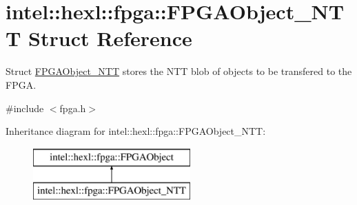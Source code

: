 \hypertarget{structintel_1_1hexl_1_1fpga_1_1FPGAObject__NTT}{\section{intel\-:\-:hexl\-:\-:fpga\-:\-:F\-P\-G\-A\-Object\-\_\-\-N\-T\-T Struct Reference}
\label{structintel_1_1hexl_1_1fpga_1_1FPGAObject__NTT}
}


Struct \hyperlink{structintel_1_1hexl_1_1fpga_1_1FPGAObject__NTT}{F\-P\-G\-A\-Object\-\_\-\-N\-T\-T} stores the N\-T\-T blob of objects to be transfered to the F\-P\-G\-A.  




{\ttfamily \#include $<$fpga.\-h$>$}

Inheritance diagram for intel\-:\-:hexl\-:\-:fpga\-:\-:F\-P\-G\-A\-Object\-\_\-\-N\-T\-T\-:\begin{figure}[H]
\begin{center}
\leavevmode
\includegraphics[height=2.000000cm]{structintel_1_1hexl_1_1fpga_1_1FPGAObject__NTT}
\end{center}
\end{figure}
